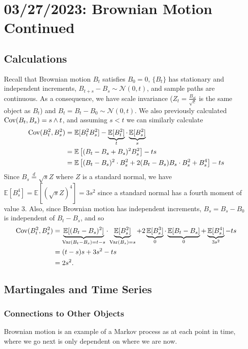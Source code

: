 \chapter{03/27/2023: Brownian Motion Continued}
\section{Calculations}
Recall that Brownian motion $B_t$ satisfies $B_0=0$, $\{B_t\}$ has stationary and independent increments, $B_{t+s}-B_s\sim\mathcal N(0,t)$, and sample paths are continuous. As a consequence, we have scale invariance ($Z_t=\frac{B_{ct}}{\sqrt c}$ is the same object as $B_t$) and $B_t=B_t-B_0\sim\mathcal N(0,t)$. We also previously calculated $\operatorname{Cov}(B_t,B_s)=s\wedge t$, and assuming $s<t$ we can similarly calculate \begin{align*}
	\operatorname{Cov}(B_t^2,B_s^2) &= \mathbb E[B_t^2B_s^2] - \underbrace{\mathbb E[B_t^2]}_{t}\cdot\underbrace{\mathbb E[B_s^2]}_s \\
					  &= \mathbb E \left[ (B_t-B_s+B_s)^2 B_s^2 \right] - ts \\
					  &= \mathbb E \left[ (B_t-B_s)^2\cdot B_s^2 + 2(B_t-B_s)B_s\cdot B_s^2 + B_s^4 \right] - ts
\end{align*} Since $B_s\overset{d}{=}\sqrt s Z$ where $Z$ is a standard normal, we have $\mathbb E[B_s^4] = \mathbb E[(\sqrt s Z)^4] = 3s^2$ since a standard normal has a fourth moment of value 3. Also, since Brownian motion has independent increments, $B_s=B_s-B_0$ is independent of $B_t-B_s$, and so \begin{align*}
	\operatorname{Cov}(B_t^2,B_s^2) &= \underbrace{\mathbb E[(B_t-B_s)^2]}_{\operatorname{Var}(B_t-B_s)=t-s}\cdot\underbrace{\mathbb E[B_s^2]}_{\operatorname{Var}(B_s)=s} + 2\underbrace{\mathbb E[B_s^3]}_0\cdot\underbrace{\mathbb E[B_t-B_s]}_0 + \underbrace{\mathbb E[B_s^4]}_{3s^2} - ts \\
					  &= (t-s)s + 3s^2 - ts \\
					  &= 2s^2.
\end{align*}

\section{Martingales and Time Series}
\subsection{Connections to Other Objects}
Brownian motion is an example of a Markov process as at each point in time, where we go next is only dependent on where we are now.


